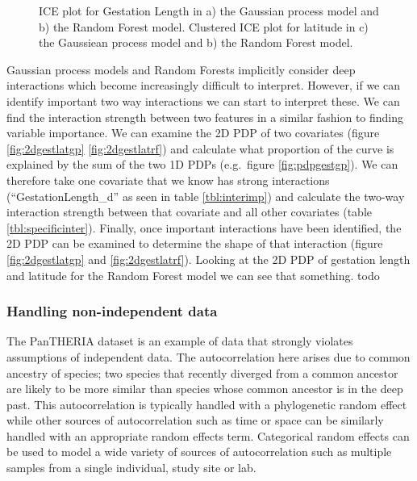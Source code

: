 \documentclass[10pt,]{article}
\begin{document}
\begin{figure}[t!]
  \centering


  \label{fig:ice}
  \caption{
    ICE plot for Gestation Length in a) the Gaussian process model and b) the Random Forest model. 
    Clustered ICE plot for latitude in c) the Gaussiean process model and b) the Random Forest model.
  }
\end{figure}


Gaussian process models and Random Forests implicitly consider deep interactions which become increasingly difficult to interpret. However, if we can identify important two way interactions we can start to interpret these. We can find the interaction strength between two features in a similar fashion to finding variable importance. We can examine the 2D PDP of two covariates (figure \ref{fig:2dgestlatgp} \ref{fig:2dgestlatrf}) and calculate what proportion of the curve is explained by the sum of the two 1D PDPs (e.g.~figure \ref{fig:pdpgestgp}). We can therefore take one covariate that we know has strong interactions (``GestationLength\_d'' as seen in table \ref{tbl:interimp}) and calculate the two-way interaction strength between that covariate and all other covariates (table \ref{tbl:specificinter}). Finally, once important interactions have been identified, the 2D PDP can be examined to determine the shape of that interaction (figure \ref{fig:2dgestlatgp} and \ref{fig:2dgestlatrf}). Looking at the 2D PDP of gestation length and latitude for the Random Forest model we can see that something. todo




\subsubsection{Handling non-independent data}\label{handling-non-independent-data}

The PanTHERIA dataset is an example of data that strongly violates assumptions of independent data. The autocorrelation here arises due to common ancestry of species; two species that recently diverged from a common ancestor are likely to be more similar than species whose common ancestor is in the deep past. This autocorrelation is typically handled with a phylogenetic random effect while other sources of autocorrelation such as time or space can be similarly handled with an appropriate random effects term. Categorical random effects can be used to model a wide variety of sources of autocorrelation such as multiple samples from a single individual, study site or lab.
\end{document}
